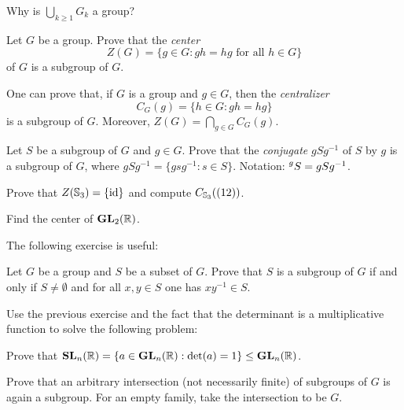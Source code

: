 Why is $\bigcup_{k\geq1}G_k$ a group? 

\begin{exercise}
\label{xca:center}
        Let $G$ be a group. Prove that the \emph{center} 
        \[
                Z(G)=\{g\in G:gh=hg\text{ for all $h\in G$}\}
        \]
        of $G$ is a subgroup of $G$. 
\end{exercise}

One can prove that, if $G$ is a group and $g\in G$, then 
the \emph{centralizer} 
\[
C_G(g)=\{h\in G:gh=hg\}
\]
is a subgroup of $G$. Moreover, 
$Z(G)=\bigcap_{g\in G}C_G(g)$. 

\begin{exercise}
        \label{xca:conjugate}
        Let $S$ be a subgroup of $G$ and $g\in G$. Prove that
        the \emph{conjugate} $gSg^{-1}$
        of $S$ by $g$ is a subgroup of $G$, where 
        $gSg^{-1}=\{gsg^{-1}:s\in S\}$. 
        Notation: 
        $\prescript{g}{}S=gSg^{-1}$.
\end{exercise}


\begin{exercise}
\label{xca:center_S3}
        Prove that $Z(\mathbb{S}_3)=\{\operatorname{id}\}$ and compute $C_{\mathbb{S}_3}((12))$.
\end{exercise}

\begin{exercise}
\label{xca:center_2x2}
    Find the center of $\mathbf{GL}_2(\mathbb{R})$.
\end{exercise}

The following exercise is useful: 

\begin{exercise}
\label{xca:subgroup}
        Let $G$ be a group and $S$ be a subset of $G$. 
        Prove that $S$ is a subgroup of $G$ if and only if 
        $S\ne\emptyset$ and for all $x,y\in S$ one has
        $xy^{-1}\in S$.
\end{exercise}

Use the previous exercise and
the fact that the determinant is a multiplicative function
to solve the following problem:

\begin{exercise}
\label{xca:SL_subgroup}
Prove that $\mathbf{SL}_n(\mathbb{R})=\{a\in\mathbf{GL}_n(\mathbb{R}):\det(a)=1\}\leq\mathbf{GL}_n(\mathbb{R})$. 
\end{exercise}

\begin{exercise}
\label{xca:intersection}
    Prove that an arbitrary intersection (not necessarily finite) of subgroups of $G$
    is again a subgroup. For an empty family, take the intersection to be $G$. 
\end{exercise}

